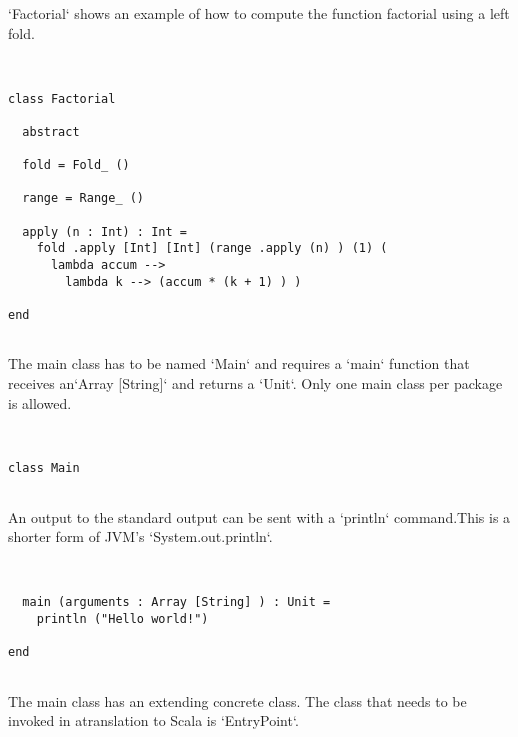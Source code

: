 \documentclass[12pt,a4paper]{article}
\begin{document}
`Factorial` shows an example of how to compute the function factorial using a left fold. 


\begin{lstlisting}


class Factorial

  abstract

  fold = Fold_ ()

  range = Range_ ()

  apply (n : Int) : Int =
    fold .apply [Int] [Int] (range .apply (n) ) (1) (
      lambda accum -->
        lambda k --> (accum * (k + 1) ) )

end


\end{lstlisting}

The main class has to be named `Main` and requires a `main` function that receives an`Array [String]` and returns a `Unit`. Only one main class per package is allowed. 


\begin{lstlisting}


class Main


\end{lstlisting}

An output to the standard output can be sent with a `println` command.This is a shorter form of JVM's `System.out.println`. 


\begin{lstlisting}


  main (arguments : Array [String] ) : Unit =
    println ("Hello world!")

end


\end{lstlisting}

The main class has an extending concrete class. The class that needs to be invoked in atranslation to Scala is `EntryPoint`. 


\begin{lstlisting}


\end{lstlisting}
\end{document}
